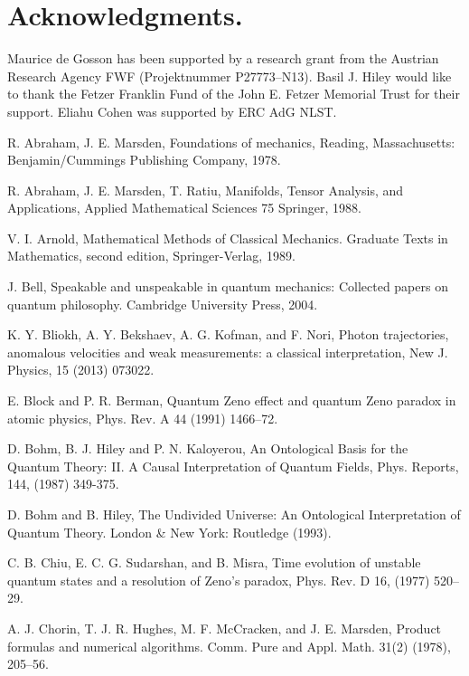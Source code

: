 \documentclass[12pt]{article}%
\begin{document}
\section{Acknowledgments.}

Maurice de Gosson has been supported by a research grant from the Austrian
Research Agency FWF (Projektnummer P27773--N13). Basil J. Hiley would like to
thank the Fetzer Franklin Fund of the John E. Fetzer Memorial Trust for their
support. Eliahu Cohen was supported by ERC AdG NLST.

\begin{thebibliography}{99}                                                                                               %


R. Abraham, J. E. Marsden, Foundations of mechanics, Reading,
Massachusetts: Benjamin/Cummings Publishing Company, 1978.

R. Abraham, J. E. Marsden, T. Ratiu, Manifolds, Tensor Analysis,
and Applications, Applied Mathematical Sciences 75 Springer, 1988.

V. I. Arnold, Mathematical Methods of Classical Mechanics.
Graduate Texts in Mathematics, second edition, Springer-Verlag, 1989.

J. Bell, Speakable and unspeakable in quantum mechanics:
Collected papers on quantum philosophy. Cambridge University Press, 2004.

K. Y. Bliokh, A. Y. Bekshaev, A. G. Kofman, and F. Nori,
Photon trajectories, anomalous velocities and weak measurements: a classical
interpretation, New J. Physics, 15 (2013) 073022.

E. Block and P. R. Berman, Quantum Zeno effect and quantum
Zeno paradox in atomic physics, Phys. Rev. A 44 (1991) 1466--72.

D. Bohm, B. J. Hiley and P. N. Kaloyerou, An Ontological
Basis for the Quantum Theory: II. A Causal Interpretation of Quantum Fields,
Phys. Reports, 144, (1987) 349-375.

D. Bohm and B. Hiley, The Undivided Universe: An Ontological
Interpretation of Quantum Theory. London \& New York: Routledge (1993).

C. B. Chiu, E. C. G. Sudarshan, and B. Misra, Time
evolution of unstable quantum states and a resolution of Zeno's paradox, Phys.
Rev. D 16, (1977) 520--29.

A. J. Chorin, T. J. R. Hughes, M. F. McCracken, and J. E.
Marsden, Product formulas and numerical algorithms. Comm. Pure and Appl. Math.
31(2) (1978), 205--56.


\end{thebibliography}
\end{document}
